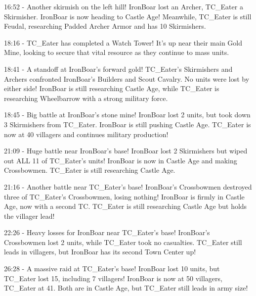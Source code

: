 16:52 - Another skirmish on the left hill! IronBoar lost an Archer, TC\_Eater a Skirmisher. IronBoar is now heading to Castle Age! Meanwhile, TC\_Eater is still Feudal, researching Padded Archer Armor and has 10 Skirmishers. \par \vspace{1em}

18:16 - TC\_Eater has completed a Watch Tower! It's up near their main Gold Mine, looking to secure that vital resource as they continue to mass units. \par \vspace{1em}

18:41 - A standoff at IronBoar's forward gold! TC\_Eater's Skirmishers and Archers confronted IronBoar's Builders and Scout Cavalry. No units were lost by either side! IronBoar is still researching Castle Age, while TC\_Eater is researching Wheelbarrow with a strong military force. \par \vspace{1em}

18:45 - Big battle at IronBoar's stone mine! IronBoar lost 2 units, but took down 3 Skirmishers from TC\_Eater. IronBoar is still pushing Castle Age. TC\_Eater is now at 40 villagers and continues military production! \par \vspace{1em}

21:09 - Huge battle near IronBoar's base! IronBoar lost 2 Skirmishers but wiped out ALL 11 of TC\_Eater's units! IronBoar is now in Castle Age and making Crossbowmen. TC\_Eater is still researching Castle Age. \par \vspace{1em}

21:16 - Another battle near TC\_Eater's base! IronBoar's Crossbowmen destroyed three of TC\_Eater's Crossbowmen, losing nothing! IronBoar is firmly in Castle Age, now with a second TC. TC\_Eater is still researching Castle Age but holds the villager lead! \par \vspace{1em}

22:26 - Heavy losses for IronBoar near TC\_Eater's base! IronBoar's Crossbowmen lost 2 units, while TC\_Eater took no casualties. TC\_Eater still leads in villagers, but IronBoar has its second Town Center up! \par \vspace{1em}

26:28 - A massive raid at TC\_Eater's base! IronBoar lost 10 units, but TC\_Eater lost 15, including 7 villagers! IronBoar is now at 50 villagers, TC\_Eater at 41. Both are in Castle Age, but TC\_Eater still leads in army size! \par \vspace{1em}

